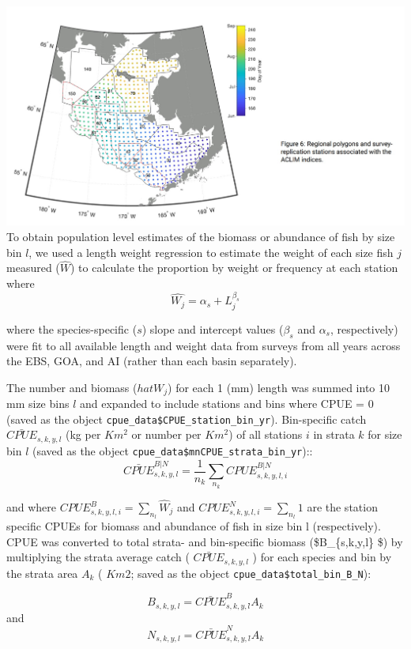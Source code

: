 \documentclass[
]{article}
\begin{document}
\includegraphics{figs/Kearney_2023.jpg} To obtain population level
estimates of the biomass or abundance of fish by size bin \(l\), we used
a length weight regression to estimate the weight of each size fish
\(j\) measured (\(\hat{W}\)) to calculate the proportion by weight or
frequency at each station where \[\hat{W_j} = \alpha_s+L_j^{\beta_s} \]

where the species-specific (\(s\)) slope and intercept values
(\(\beta_s\) and \(\alpha_s\), respectively) were fit to all available
length and weight data from surveys from all years across the EBS, GOA,
and AI (rather than each basin separately).

The number and biomass (\(hat{W_j}\)) for each 1 (mm) length was summed
into 10 mm size bins \(l\) and expanded to include stations and bins
where CPUE = 0 (saved as the object
\texttt{cpue\_data\$CPUE\_station\_bin\_yr}). Bin-specific catch
\(\bar{CPUE}_{s,k,y,l}\) (kg per \(Km^2\) or number per \(Km^2\)) of all
stations \(i\) in strata \(k\) for size bin \(l\) (saved as the object
\texttt{cpue\_data\$mnCPUE\_strata\_bin\_yr})::
\[\bar{CPUE}^{B|N}_{s,k,y,l}=\frac{1}{n_k}\sum_{n_k}{CPUE^{B|N}_{s,k,y,l,i}}\]

and where \(CPUE^B_{s,k,y,l,i} = \sum_{n_l}\hat{W}_j\) and
\(CPUE^N_{s,k,y,l,i} = \sum_{n_l}1\) are the station specific CPUEs for
biomass and abundance of fish in size bin l (respectively). CPUE was
converted to total strata- and bin-specific biomass (\$B\_\{s,k,y,l\}
\$) by multiplying the strata average catch ( \(\bar{CPUE}_{s,k,y,l}\) )
for each species and bin by the strata area \(A_{k}\) ( \(Km2\); saved
as the object \texttt{cpue\_data\$total\_bin\_B\_N}):

\[B_{s,k,y,l} =  \bar{CPUE}^{B}_{s,k,y,l} \dot{}A_{k}\] and
\[N_{s,k,y,l} =  \bar{CPUE}^{N}_{s,k,y,l} \dot{}A_{k}\]
\end{document}
